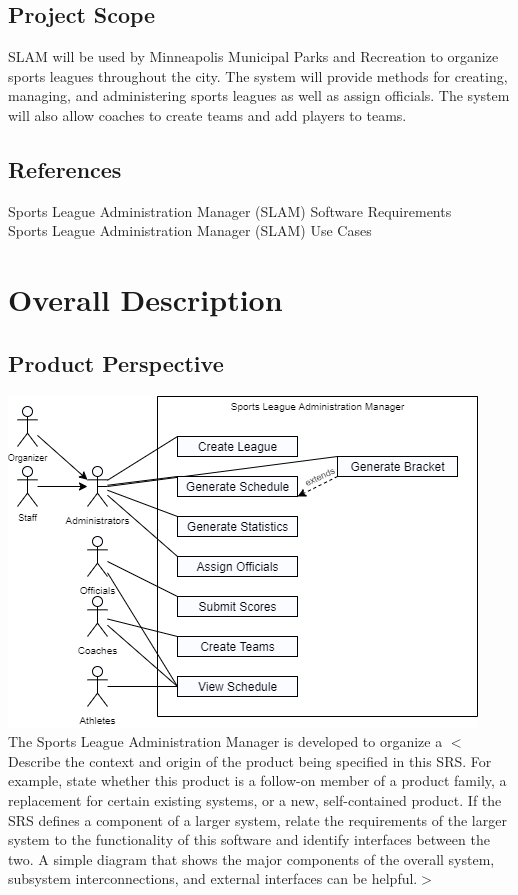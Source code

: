 \documentclass{scrreprt}
\begin{document}
\section{Project Scope}
SLAM will be used by Minneapolis Municipal Parks and Recreation to organize sports leagues throughout the city. The system will provide methods for creating, managing, and administering sports leagues as well as assign officials. The system will also allow coaches to create teams and add players to teams.


\section{References}
\noindent
Sports League Administration Manager (SLAM) Software Requirements \\
\noindent
Sports League Administration Manager (SLAM) Use Cases

\chapter{Overall Description}

\section{Product Perspective}
\includegraphics[width=\textwidth]{diagram} \\

The Sports League Administration Manager is developed to organize a 
$<$Describe the context and origin of the product being specified in this SRS.  
For example, state whether this product is a follow-on member of a product 
family, a replacement for certain existing systems, or a new, self-contained 
product. If the SRS defines a component of a larger system, relate the 
requirements of the larger system to the functionality of this software and 
identify interfaces between the two. A simple diagram that shows the major 
components of the overall system, subsystem interconnections, and external 
interfaces can be helpful.$>$
\end{document}
